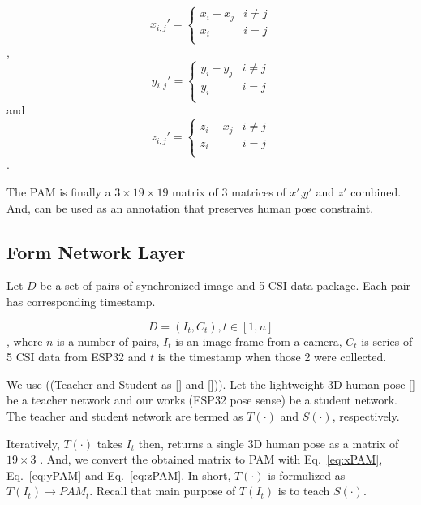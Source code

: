 \documentclass[conference]{IEEEtran}
\begin{document}
	\begin{equation}
	x_{i,j}' = \begin{cases}
	x_i-x_j &\text{$i\neq j$}\\
	x_i &\text{$i=j$}\\
	\end{cases}
	\label{eq:xPAM}
	\end{equation},
	\begin{equation}
	y_{i,j}' = \begin{cases}
	y_i-y_j &\text{$i\neq j$}\\
	y_i &\text{$i=j$}\\
	\end{cases}
	\label{eq:yPAM}
	\end{equation}
	and
	\begin{equation}
	z_{i,j}' = \begin{cases}
	z_i-x_j &\text{$i\neq j$}\\
	z_i &\text{$i=j$}\\
	\end{cases}
	\label{eq:zPAM}
	\end{equation}.
	
	The PAM is finally a $3\times19\times19$ matrix of 3  matrices of $x'$,$y'$ and $z'$ combined. And, can be used as an annotation that preserves human pose constraint.

	\subsection{Form Network Layer}
	Let $D$ be a set of pairs of synchronized image and 5 CSI data package. Each pair has corresponding timestamp.
	
	\begin{equation}
	D =  {(I_t, C_t), t \in [1, n]}
	\label{eq:Dataset}
	\end{equation}, where  $n$ is a number of pairs, $I_t$ is an image frame from a camera, $C_t$ is series of 5 CSI data from ESP32 and $t$ is the timestamp when those 2 were collected.
	
	  We use ((Teacher and Student as [] and [])). Let the lightweight 3D human pose [] be a teacher network and our works (ESP32 pose sense) be a student network. The teacher and student network are termed as $T(·)$ and $S(·)$, respectively. 
	  
	  Iteratively, $T(·)$ takes $I_t$ then, returns a single 3D human pose as a matrix of $19 \times 3$ . And, we convert the obtained matrix to PAM with Eq.~\ref{eq:xPAM}, Eq.~\ref{eq:yPAM} and Eq.~\ref{eq:zPAM}. In short, $T(·)$ is formulized  as $T(I_t) \rightarrow PAM_t$. Recall that main purpose of $T(I_t)$ is to teach $S(·)$.
	 
\end{document}
